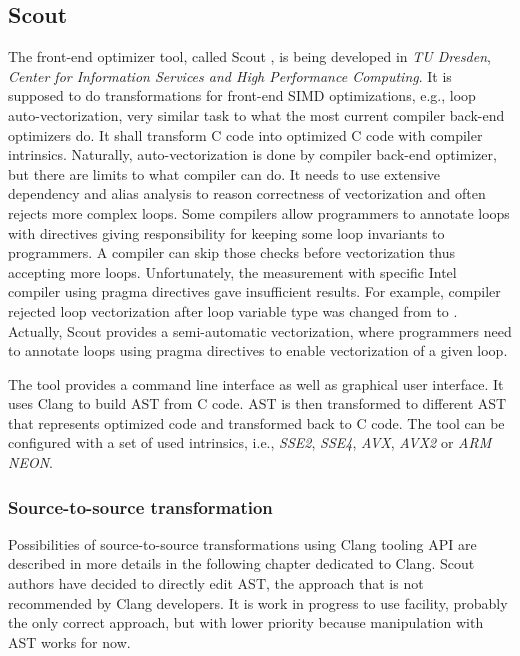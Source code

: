 \subsection{Scout}
\label{scout}
The front-end optimizer tool, called Scout \cite{scout}, is being developed in \emph{TU Dresden}, \emph{Center for Information Services and High Performance Computing}. It is supposed to do transformations for front-end SIMD optimizations, e.g., loop auto-vectorization, very similar task to what the most current compiler back-end optimizers do. It shall transform C code into optimized C code with compiler intrinsics. Naturally, auto-vectorization is done by compiler back-end optimizer, but there are limits to what compiler can do. It needs to use extensive dependency and alias analysis to reason correctness of vectorization and often rejects more complex loops. Some compilers allow programmers to annotate loops with  directives giving responsibility for keeping some loop invariants to programmers. A compiler can skip those checks before vectorization thus accepting more loops. Unfortunately, the measurement with specific Intel compiler using pragma directives gave insufficient results. For example, compiler rejected loop vectorization after loop variable type was changed from  to . Actually, Scout provides a semi-automatic vectorization, where programmers need to annotate loops using pragma directives to enable vectorization of a given loop. 

The tool provides a command line interface as well as graphical user interface. It uses Clang to build AST from C code. AST is then transformed to different AST that represents optimized code and transformed back to C code. The tool can be configured with a set of used intrinsics, i.e., \emph{SSE2}, \emph{SSE4}, \emph{AVX}, \emph{AVX2} or \emph{ARM NEON}.

\subsubsection{Source-to-source transformation}
Possibilities of source-to-source transformations using Clang tooling API are described in more details in the following chapter dedicated to Clang. Scout authors have decided to directly edit AST, the approach that is not recommended by Clang developers. It is work in progress to use  facility, probably the only correct approach, but with lower priority because manipulation with AST works for now.


